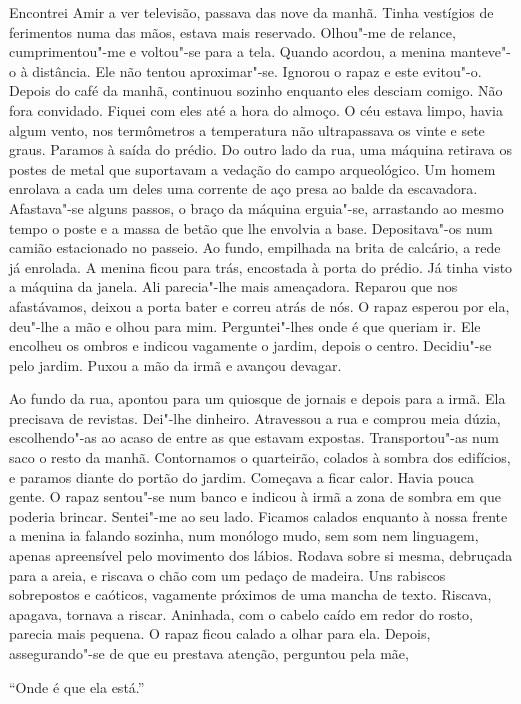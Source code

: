 Encontrei Amir a ver televisão, passava das nove da manhã. Tinha
vestígios de ferimentos numa das mãos, estava mais reservado. Olhou"-me
de relance, cumprimentou"-me e voltou"-se para a tela. Quando acordou, a
menina manteve"-o à distância. Ele não tentou aproximar"-se. Ignorou o
rapaz e este evitou"-o. Depois do café da manhã, continuou sozinho
enquanto eles desciam comigo. Não fora convidado. Fiquei com eles até a
hora do almoço. O céu estava limpo, havia algum vento, nos termômetros a
temperatura não ultrapassava os vinte e sete graus. Paramos à saída do
prédio. Do outro lado da rua, uma máquina retirava os postes de metal
que suportavam a vedação do campo arqueológico. Um homem enrolava a cada
um deles uma corrente de aço presa ao balde da escavadora. Afastava"-se
alguns passos, o braço da máquina erguia"-se, arrastando ao mesmo tempo
o poste e a massa de betão que lhe envolvia a base. Depositava"-os num
camião estacionado no passeio. Ao fundo, empilhada na brita de calcário,
a rede já enrolada. A menina ficou para trás, encostada à porta do
prédio. Já tinha visto a máquina da janela. Ali parecia"-lhe mais
ameaçadora. Reparou que nos afastávamos, deixou a porta bater e correu
atrás de nós. O rapaz esperou por ela, deu"-lhe a mão e olhou para mim.
Perguntei"-lhes onde é que queriam ir. Ele encolheu os ombros e indicou
vagamente o jardim, depois o centro. Decidiu"-se pelo jardim. Puxou a
mão da irmã e avançou devagar.

Ao fundo da rua, apontou para um quiosque de jornais e depois para a
irmã. Ela precisava de revistas. Dei"-lhe dinheiro. Atravessou a rua e
comprou meia dúzia, escolhendo"-as ao acaso de entre as que estavam
expostas. Transportou"-as num saco o resto da manhã. Contornamos o
quarteirão, colados à sombra dos edifícios, e paramos diante do portão
do jardim. Começava a ficar calor. Havia pouca gente. O rapaz sentou"-se
num banco e indicou à irmã a zona de sombra em que poderia brincar.
Sentei"-me ao seu lado. Ficamos calados enquanto à nossa frente a menina
ia falando sozinha, num monólogo mudo, sem som nem linguagem, apenas
apreensível pelo movimento dos lábios. Rodava sobre si mesma, debruçada
para a areia, e riscava o chão com um pedaço de madeira. Uns rabiscos
sobrepostos e caóticos, vagamente próximos de uma mancha de texto.
Riscava, apagava, tornava a riscar. Aninhada, com o cabelo caído em
redor do rosto, parecia mais pequena. O rapaz ficou calado a olhar para
ela. Depois, assegurando"-se de que eu prestava atenção, perguntou pela
mãe,

``Onde é que ela está.''

